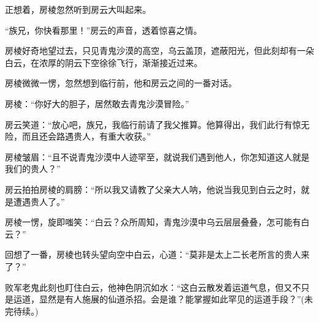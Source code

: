 \begin{this_body}
正想着，房棱忽然听到房云大叫起来。

“族兄，你快看那里！”房云的声音，透着惊喜之情。

房棱好奇地望过去，只见青鬼沙漠的高空，乌云盖顶，遮蔽阳光，但此刻却有一朵白云，在浓厚的阴云下空徐徐飞行，渐渐接近过来。

房棱微微一愣，忽然想到临行前，他和房云之间的一番对话。

房棱：“你好大的胆子，居然敢去青鬼沙漠冒险。”

房云笑道：“放心吧，族兄，我临行前请了我父推算。他算得出，我们此行有惊无险，而且还会路遇贵人，有重大收获。”

房棱皱眉：“且不说青鬼沙漠中人迹罕至，就说我们遇到他人，你怎知道这人就是我们的贵人？”

房云拍拍房棱的肩膀：“所以我又请教了父亲大人呐，他说当我见到白云之时，就是遭遇贵人了。”

房棱一愣，旋即嗤笑：“白云？众所周知，青鬼沙漠中乌云层层叠叠，怎可能有白云？”

回想了一番，房棱也转头望向空中白云，心道：“莫非是太上二长老所言的贵人来了？”

败军老鬼此刻也盯住白云，他神色阴沉如水：“这白云散发着运道气息，但又不只是运道，显然是有人施展的仙道杀招。会是谁？能掌握如此罕见的运道手段？”(未完待续。)

\end{this_body}

